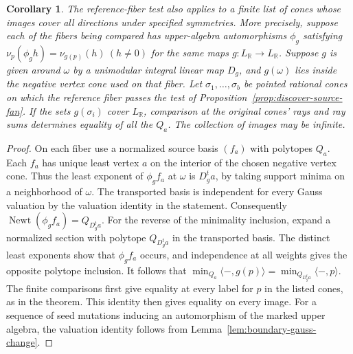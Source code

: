 \documentclass[11pt,reqno]{amsart}
\numberwithin{equation}{section}
\newtheorem{corollary}[theorem]{Corollary}
\theoremstyle{definition}
\theoremstyle{remark}
\DeclareMathOperator{\Newt}{Newt}
\begin{document}
\begin{corollary}\label{cor:source-family-symmetry-probes}
The reference-fiber test also applies to a finite list of cones whose
images cover all directions under specified symmetries. More precisely,
suppose each of the fibers being compared has upper-algebra
automorphisms \(\phi_g\) satisfying
\(\nu_p(\phi_g h)=\nu_{g(p)}(h)\ (h\ne0)\)
for the same maps \(g:L_{\mathbb R}\to L_{\mathbb R}\). Suppose \(g\)
is given around \(\omega\) by a unimodular integral linear map
\(D_g\), and \(g(\omega)\) lies inside the negative vertex cone
used on that fiber. Let \(\sigma_1,\ldots,\sigma_b\) be pointed
rational cones on which the reference fiber passes the test of
Proposition~\ref{prop:discover-source-fan}. If the sets
\(g(\sigma_i)\) cover \(L_{\mathbb R}\), comparison at the original
cones' rays and ray sums determines equality of all the \(Q_a\).
The collection of images may be infinite.
\end{corollary}
\begin{proof}
On each fiber use a normalized source basis \((f_a)\) with polytopes
\(Q_a\). Each \(f_a\) has unique least vertex \(a\) on the interior
of the chosen negative vertex cone. Thus the least exponent of
\(\phi_g f_a\) at \(\omega\) is \(D_g^t a\), by taking support
minima on a neighborhood of \(\omega\). The transported basis is
independent for every Gauss valuation by the valuation identity in the statement. Consequently \(\Newt(\phi_g f_a)=Q_{D_g^t a}\). For the
reverse of the minimality inclusion, expand a normalized section
with polytope \(Q_{D_g^t a}\) in the transported basis. The distinct
least exponents show that \(\phi_g f_a\) occurs, and independence at all
weights gives the opposite polytope inclusion. It follows that
\(\min_{Q_a}\langle -,g(p)\rangle =\min_{Q_{D_g^t a}}\langle -,p\rangle\).
The finite comparisons first give equality at every label for \(p\)
in the listed cones, as in the theorem. This identity then gives
equality on every image. For a sequence of seed mutations inducing an
automorphism of the marked upper algebra, the valuation identity follows
from Lemma~\ref{lem:boundary-gauss-change}.
\end{proof}
\end{document}
